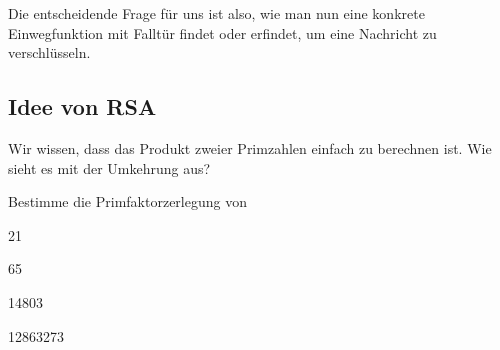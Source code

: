 \documentclass[%
<<<<<<< Updated upstream
11pt,%
twoside,%
titlepage,%
german,%
headsepline%
]{scrartcl}
\begin{document}
\begin{cdef}[Linksverschiebung]{}
\begin{cdef}{}
Die entscheidende Frage für uns ist also, wie man nun eine konkrete Einwegfunktion mit Falltür findet oder erfindet, um eine Nachricht zu verschlüsseln.

\subsection{Idee von RSA}
Wir wissen, dass das Produkt zweier Primzahlen einfach zu berechnen ist. Wie sieht es mit der Umkehrung aus?
\begin{ueb}
Bestimme die Primfaktorzerlegung von

\begin{minipage}{0.2\textwidth}
\begin{enumeratea}
\item 21
\item 65
\end{enumeratea}
\end{minipage}
\begin{minipage}{0.4\textwidth}
\begin{enumeratea}
\setcounter{enumi}{2}
\item 14803
\item 12863273
\end{enumeratea}
\end{minipage}
\end{ueb}


\end{cdef}
\end{cdef}
\end{document}
